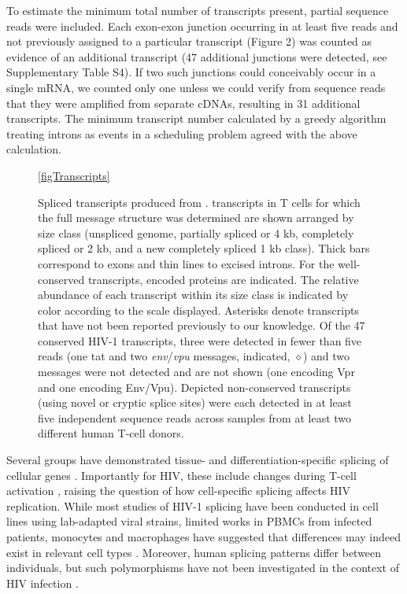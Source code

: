 \documentclass[../sherrill-Mix_thesis.tex]{subfiles}
\begin{document}
To estimate the minimum total number of transcripts present, partial sequence reads were included. Each exon-exon junction occurring in at least five reads and not previously assigned to a particular transcript (Figure 2) was counted as evidence of an additional transcript (47 additional junctions were detected, see Supplementary Table S4). If two such junctions could conceivably occur in a single mRNA, we counted only one unless we could verify from sequence reads that they were amplified from separate cDNAs, resulting in 31 additional transcripts. The minimum transcript number calculated by a greedy algorithm treating introns as events in a scheduling problem agreed with the above calculation. 

\begin{figure}
	\centering
	\caption[Spliced transcripts produced from \hivEight{}]{Spliced transcripts produced from \hivEight{}. \hivEight{} transcripts in T cells for which the full message structure was determined are shown arranged by size class (unspliced genome, partially spliced or 4 kb, completely spliced or 2 kb, and a new completely spliced 1 kb class). Thick bars correspond to exons and thin lines to excised introns. For the well-conserved transcripts, encoded proteins are indicated. The relative abundance of each transcript within its size class is indicated by color according to the scale displayed. Asterisks denote transcripts that have not been reported previously to our knowledge. Of the 47 conserved HIV-1 transcripts, three were detected in fewer than five reads (one tat and two \textit{env}/\textit{vpu} messages, indicated, $\diamond$) and two messages were not detected and are not shown (one encoding Vpr and one encoding Env/Vpu). Depicted non-conserved transcripts (using novel or cryptic splice sites) were each detected in at least five independent sequence reads across samples from at least two different human T-cell donors.}
	\ref{figTranscripts}
\end{figure}


Several groups have demonstrated tissue- and differentiation-specific splicing of cellular genes \citep{Wang2008,Grabowski2011,Llorian2011}. Importantly for HIV, these include changes during T-cell activation \citep{Ip2007,Topp2008}, raising the question of how cell-specific splicing affects HIV replication. While most studies of HIV-1 splicing have been conducted in cell lines using lab-adapted viral strains, limited works in PBMCs from infected patients, monocytes and macrophages have suggested that differences may indeed exist in relevant cell types \citep{Carrera2010,Saltarelli1996,Sonza2002,Dowling2008}. Moreover, human splicing patterns differ between individuals, but such polymorphisms have not been investigated in the context of HIV infection \citep{Hull2007,Kwan2007}.
\end{document}
